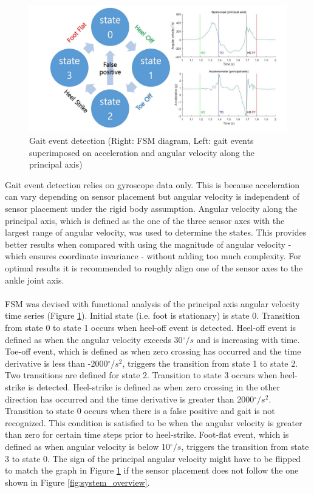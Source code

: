 \begin{figure}[th]
\captionsetup{justification=raggedright,singlelinecheck=false}
\centering
\includegraphics[width=\textwidth,height=\textheight,keepaspectratio]{Figures/gait_event_detection.jpg}
\decoRule
\caption[Gait event detection]{Gait event detection (Right: FSM diagram, Left: gait events superimposed on acceleration and angular velocity along the principal axis)}
\label{fig:gait_event_detection}
\end{figure}
\noindent
Gait event detection relies on gyroscope data only. This is because acceleration can vary depending on sensor placement but angular velocity is independent of sensor placement under the rigid body assumption. Angular velocity along the principal axis, which is defined as the one of the three sensor axes with the largest range of angular velocity, was used to determine the states. This provides better results when compared with using the magnitude of angular velocity - which ensures coordinate invariance - without adding too much complexity. For optimal results it is recommended to roughly align one of the sensor axes to the ankle joint axis. 
\\\\
FSM was devised with functional analysis of the principal axis angular velocity time series (Figure \ref{fig:gait_event_detection}). Initial state (i.e. foot is stationary) is state 0. Transition from state 0 to state 1 occurs when heel-off event is detected. Heel-off event is defined as when the angular velocity exceeds 30$^{\circ}/s$ and is increasing with time. Toe-off event, which is defined as when zero crossing has occurred and the time derivative is less than -2000$^{\circ}/s^{2}$, triggers the transition from state 1 to state 2. Two transitions are defined for state 2. Transition to state 3 occurs when heel-strike is detected. Heel-strike is defined as when zero crossing in the other direction has occurred and the time derivative is greater than 2000$^{\circ}/s^{2}$. Transition to state 0 occurs when there is a false positive and gait is not recognized. This condition is satisfied to be when the angular velocity is greater than zero for certain time steps prior to heel-strike. Foot-flat event, which is defined as when angular velocity is below 10$^{\circ}/s$, triggers the transition from state 3 to state 0. The sign of the principal angular velocity might have to be flipped to match the graph in Figure \ref{fig:gait_event_detection} if the sensor placement does not follow the one shown in Figure \ref{fig:system_overview}.

